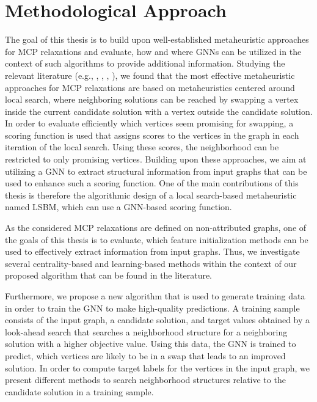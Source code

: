 \documentclass[draft,final]{vutinfth} %
\begin{document}
\section{Methodological Approach}\label{sec:methodology}
The goal of this thesis is to build upon well-established metaheuristic approaches for MCP relaxations and evaluate, how and where GNNs can be utilized in the context of such algorithms to provide additional information. 
Studying the relevant literature (e.g., \cite{djeddi_extension_2019}, \cite{zhou_opposition-based_2020}, \cite{chen_nuqclq_2021}, \cite{peng_solving_2021}), we found that the most effective metaheuristic approaches for MCP relaxations are based on metaheuristics centered around local search, where neighboring solutions can be reached by swapping a vertex inside the current candidate solution with a vertex outside the candidate solution. In order to evaluate efficiently which vertices seem promising for swapping, a scoring function is used that assigns scores to the vertices in the graph in each iteration of the local search. Using these scores, the neighborhood can be restricted to only promising vertices. 
Building upon these approaches, we aim at utilizing a GNN to extract structural information from input graphs that can be used to enhance such a scoring function. 
One of the main contributions of this thesis is therefore the algorithmic design of a local search-based metaheuristic named LSBM, which can use a GNN-based scoring function. 

As the considered MCP relaxations are defined on non-attributed graphs, one of the goals of this thesis is to evaluate, which feature initialization methods can be used to effectively extract information from input graphs. Thus, we investigate several centrality-based and learning-based methods within the context of our proposed algorithm that can be found in the literature. 

Furthermore, we propose a new algorithm that is used to generate training data in order to train the GNN to make high-quality predictions. A training sample consists of the input graph, a candidate solution, and target values obtained by a look-ahead search that searches a neighborhood structure for a neighboring solution with a higher objective value. Using this data, the GNN is trained to predict, which vertices are likely to be in a swap that leads to an improved solution. In order to compute target labels for the vertices in the input graph, we present different methods to search neighborhood structures relative to the candidate solution in a training sample. 
\end{document}
